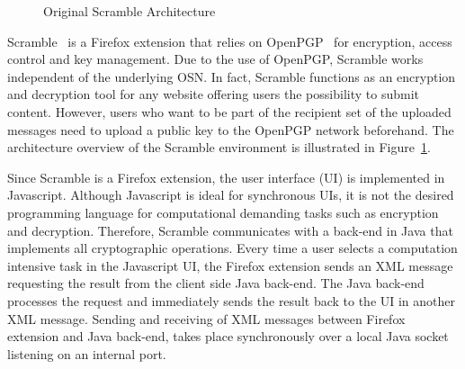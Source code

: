 \begin{figure}
\begin{center}
{{
        }
    }
    \end{center}
    \caption{Original Scramble Architecture}
    \label{fig:original_scramble_arch}
\end{figure}
\enlargethispage{\baselineskip}
Scramble~\cite{art:BeatoKW11} is a Firefox extension that relies on OpenPGP~\cite{rfc4880} for encryption, access control and key management. Due to the use of OpenPGP, Scramble works independent of the underlying OSN. In fact, Scramble functions as an encryption and decryption tool for any website offering users the possibility to submit content. However, users who want to be part of the recipient set of the uploaded messages need to upload a public key to the OpenPGP network beforehand. The architecture overview of the Scramble environment is illustrated in Figure~\ref{fig:original_scramble_arch}.

Since Scramble is a Firefox extension, the user interface (UI) is implemented in Javascript. Although Javascript is ideal for synchronous UIs, it is not the desired programming language for computational demanding tasks such as encryption and decryption. Therefore, Scramble communicates with a back-end in Java that implements all cryptographic operations. Every time a user selects a computation intensive task in the Javascript UI, the Firefox extension sends an XML message requesting the result from the client side Java back-end. The Java back-end processes the request and immediately sends the result back to the UI in another XML message. Sending and receiving of XML messages between Firefox extension and Java back-end, takes place synchronously over a local Java socket listening on an internal port.

